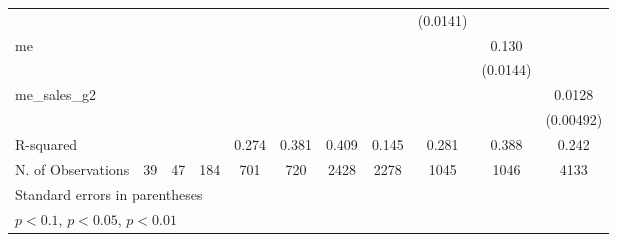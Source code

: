 {\begin{tabular}{l*{10}{c}}
            &                     &                     &                     &                     &                     &                     &                     &    (0.0141)         &                     &                     \\
[1em]
me          &                     &                     &                     &                     &                     &                     &                     &                     &       0.130\sym{***}&                     \\
            &                     &                     &                     &                     &                     &                     &                     &                     &    (0.0144)         &                     \\
[1em]
me\_sales\_g2 &                     &                     &                     &                     &                     &                     &                     &                     &                     &      0.0128\sym{**} \\
            &                     &                     &                     &                     &                     &                     &                     &                     &                     &   (0.00492)         \\
\hline
R-squared   &                     &                     &                     &       0.274         &       0.381         &       0.409         &       0.145         &       0.281         &       0.388         &       0.242         \\
N. of Observations &          39         &          47         &         184         &         701         &         720         &        2428         &        2278         &        1045         &        1046         &        4133         \\
\hline\hline
\multicolumn{11}{l}{\footnotesize Standard errors in parentheses}\\
\multicolumn{11}{l}{\footnotesize \sym{*} \(p<0.1\), \sym{**} \(p<0.05\), \sym{***} \(p<0.01\)}\\
\end{tabular}
}
